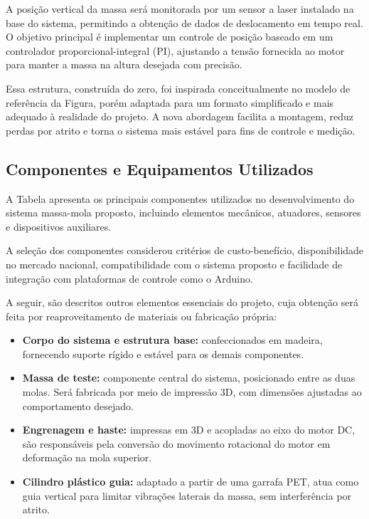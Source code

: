 \documentclass[9pt,a4paper,twocolumn,twoside]{tau-class/tau}
\begin{document}
    A posição vertical da massa será monitorada por um sensor a laser instalado na base do sistema, permitindo a obtenção de dados de deslocamento em tempo real. O objetivo principal é implementar um controle de posição baseado em um controlador proporcional-integral (PI), ajustando a tensão fornecida ao motor para manter a massa na altura desejada com precisão.

    Essa estrutura, construída do zero, foi inspirada conceitualmente no modelo de referência da Figura, porém adaptada para um formato simplificado e mais adequado à realidade do projeto. A nova abordagem facilita a montagem, reduz perdas por atrito e torna o sistema mais estável para fins de controle e medição.

    \subsection{Componentes e Equipamentos Utilizados}
    A Tabela apresenta os principais componentes utilizados no desenvolvimento do sistema massa-mola proposto, incluindo elementos mecânicos, atuadores, sensores e dispositivos auxiliares.

    A seleção dos componentes considerou critérios de custo-benefício, disponibilidade no mercado nacional, compatibilidade com o sistema proposto e facilidade de integração com plataformas de controle como o Arduino.

    A seguir, são descritos outros elementos essenciais do projeto, cuja obtenção será feita por reaproveitamento de materiais ou fabricação própria:
    \begin{itemize}
    \item \textbf{Corpo do sistema e estrutura base:} confeccionados em madeira, fornecendo suporte rígido e estável para os demais componentes.
    
    \item \textbf{Massa de teste:} componente central do sistema, posicionado entre as duas molas. Será fabricada por meio de impressão 3D, com dimensões ajustadas ao comportamento desejado.
    
    \item \textbf{Engrenagem e haste:} impressas em 3D e acopladas ao eixo do motor DC, são responsáveis pela conversão do movimento rotacional do motor em deformação na mola superior.
    
    \item \textbf{Cilindro plástico guia:} adaptado a partir de uma garrafa PET, atua como guia vertical para limitar vibrações laterais da massa, sem interferência por atrito.
\end{itemize}
\end{document}
